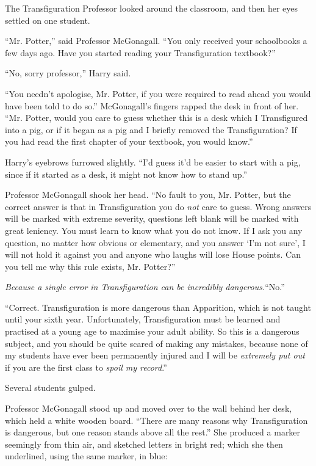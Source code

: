 The Transfiguration Professor looked around the classroom, and then her eyes settled on one student.

``Mr. Potter,'' said Professor McGonagall. ``You only received your schoolbooks a few days ago. Have you started reading your Transfiguration textbook?''

``No, sorry professor,'' Harry said.

``You needn't apologise, Mr. Potter, if you were required to read ahead you would have been told to do so.'' McGonagall's fingers rapped the desk in front of her. ``Mr. Potter, would you care to guess whether this is a desk which I Transfigured into a pig, or if it began as a pig and I briefly removed the Transfiguration? If you had read the first chapter of your textbook, you would know.''

Harry's eyebrows furrowed slightly. ``I'd guess it'd be easier to start with a pig, since if it started as a desk, it might not know how to stand up.''

Professor McGonagall shook her head. ``No fault to you, Mr. Potter, but the correct answer is that in Transfiguration you do \emph{not} care to guess. Wrong answers will be marked with extreme severity, questions left blank will be marked with great leniency. You must learn to know what you do not know. If I ask you any question, no matter how obvious or elementary, and you answer `I'm not sure', I will not hold it against you and anyone who laughs will lose House points. Can you tell me why this rule exists, Mr. Potter?''

\emph{Because a single error in Transfiguration can be incredibly dangerous.}``No.''

``Correct. Transfiguration is more dangerous than Apparition, which is not taught until your sixth year. Unfortunately, Transfiguration must be learned and practised at a young age to maximise your adult ability. So this is a dangerous subject, and you should be quite scared of making any mistakes, because none of my students have ever been permanently injured and I will be \emph{extremely put out} if you are the first class to \emph{spoil my record}.''

Several students gulped.

Professor McGonagall stood up and moved over to the wall behind her desk, which held a white wooden board. ``There are many reasons why Transfiguration is dangerous, but one reason stands above all the rest.'' She produced a marker seemingly from thin air, and sketched letters in bright red; which she then underlined, using the same marker, in blue:


